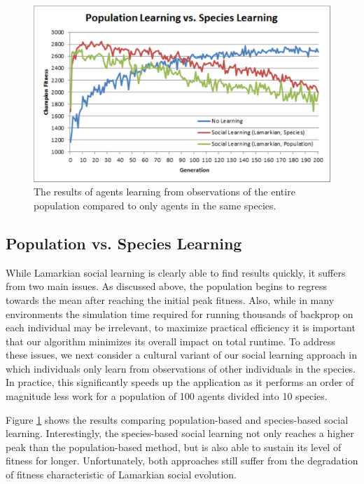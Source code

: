 \documentclass{acm_proc_article-sp}
\begin{document}
\begin{figure}
  \centering
    \includegraphics[scale=.35]{population_species.pdf}
  \caption{The results of agents learning from observations of the entire population compared to only agents in the same species.}
  \label{fig:population-species}
\end{figure}

\subsection*{Population vs. Species Learning}
While Lamarkian social learning is clearly able to find results quickly, it suffers from two main issues. As discussed above, the population begins to regress towards the mean after reaching the initial peak fitness. Also, while in many environments the simulation time required for running thousands of backprop on each individual may be irrelevant, to maximize practical efficiency it is important that our algorithm minimizes its overall impact on total runtime. To address these issues, we next consider a cultural variant of our social learning approach in which individuals only learn from observations of other individuals in the species. In practice, this significantly speeds up the application as it performs an order of magnitude less work for a population of 100 agents divided into 10 species.

Figure \ref{fig:population-species} shows the results comparing population-based and species-based social learning. Interestingly, the species-based social learning not only reaches a higher peak than the population-based method, but is also able to sustain its level of fitness for longer. Unfortunately, both approaches still suffer from the degradation of fitness characteristic of Lamarkian social evolution.
\end{document}
